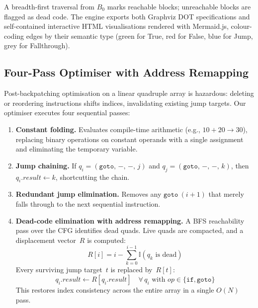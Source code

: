 \documentclass[conference]{IEEEtran}
\begin{document}
A breadth-first traversal from $B_0$ marks reachable blocks; unreachable blocks are flagged as dead code. The engine exports both Graphviz DOT specifications and self-contained interactive HTML visualisations rendered with Mermaid.js, colour-coding edges by their semantic type (green for True, red for False, blue for Jump, grey for Fallthrough).

\subsection{Four-Pass Optimiser with Address Remapping}
\label{sec:opt}

Post-backpatching optimisation on a linear quadruple array is hazardous: deleting or reordering instructions shifts indices, invalidating existing jump targets. Our optimiser executes four sequential passes:

\begin{enumerate}[leftmargin=*,noitemsep,topsep=2pt]
\item \textbf{Constant folding.} Evaluates compile-time arithmetic (e.g., $10+20 \to 30$), replacing binary operations on constant operands with a single assignment and eliminating the temporary variable.
\item \textbf{Jump chaining.} If $q_i = (\texttt{goto},\,-,\,-,\,j)$ and $q_j = (\texttt{goto},\,-,\,-,\,k)$, then $q_i.\mathit{result} \leftarrow k$, shortcutting the chain.
\item \textbf{Redundant jump elimination.} Removes any $\texttt{goto}~(i{+}1)$ that merely falls through to the next sequential instruction.
\item \textbf{Dead-code elimination with address remapping.} A BFS reachability pass over the CFG identifies dead quads. Live quads are compacted, and a displacement vector~$R$ is computed:
\begin{equation}
\label{eq:remap}
R[i] = i - \sum_{k=0}^{i-1}\mathbb{I}(q_k \text{ is dead})
\end{equation}
Every surviving jump target~$t$ is replaced by~$R[t]$:
\begin{equation}
\label{eq:apply_remap}
q_i.\mathit{result} \leftarrow R[q_i.\mathit{result}] \quad \forall\, q_i \text{ with } \mathit{op} \in \{\texttt{if}, \texttt{goto}\}
\end{equation}
This restores index consistency across the entire array in a single $O(N)$ pass.
\end{enumerate}

\end{document}
